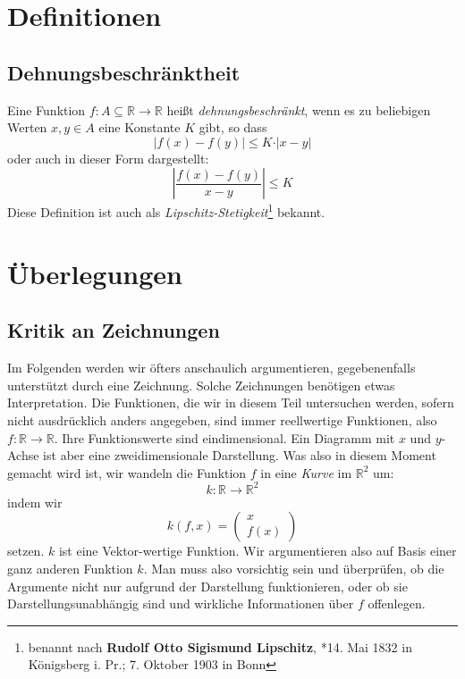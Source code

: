 \section{Definitionen}

\subsection{Dehnungsbeschränktheit}

\begin{definition}\label{def:lipschitz}
Eine Funktion $f : A \subseteq \mathbb{R} \longrightarrow \mathbb{R}$ heißt \textsl{dehnungsbeschränkt}, wenn es zu beliebigen Werten $x,y\in A$ eine Konstante $K$ gibt, so dass
\[
\left\vert f(x)-f(y)  \right\vert \le K\cdot \vert x-y \vert
\]
oder auch in dieser Form dargestellt:
\[
\left\vert \frac{f(x)-f(y)}{x-y}  \right\vert \le K
\]
Diese Definition ist auch als \textsl{Lipschitz-Stetigkeit}\footnote{benannt nach \textbf{Rudolf Otto Sigismund Lipschitz}, *14. Mai 1832 in Königsberg i. Pr.; 7. Oktober 1903 in Bonn} bekannt.
\end{definition}


\section{Überlegungen}


\subsection{Kritik an Zeichnungen}

Im Folgenden werden wir öfters anschaulich argumentieren, gegebenenfalls unterstützt durch eine Zeichnung. Solche Zeichnungen benötigen etwas Interpretation. Die Funktionen, die wir in diesem Teil untersuchen werden, sofern nicht ausdrücklich anders angegeben, sind immer reellwertige Funktionen, also $f:\mathbb{R} \longrightarrow \mathbb{R}$. Ihre Funktionswerte sind eindimensional. Ein Diagramm mit $x$ und $y$-Achse ist aber eine zweidimensionale Darstellung. Was also in diesem Moment gemacht wird ist, wir wandeln die Funktion $f$ in eine \textsl{Kurve} im $\mathbb{R}^2$ um:
\[
k : \mathbb{R} \longrightarrow \mathbb{R}^2
\]
indem wir 
\[
k(f,x) = \begin{pmatrix}
x \\
f(x)
\end{pmatrix}
\]
setzen. $k$ ist eine Vektor-wertige Funktion. Wir argumentieren also auf Basis einer ganz anderen Funktion $k$. Man muss also vorsichtig sein und überprüfen, ob die Argumente nicht nur aufgrund der Darstellung funktionieren, oder ob sie Darstellungsunabhängig sind und wirkliche Informationen über $f$ offenlegen. 

